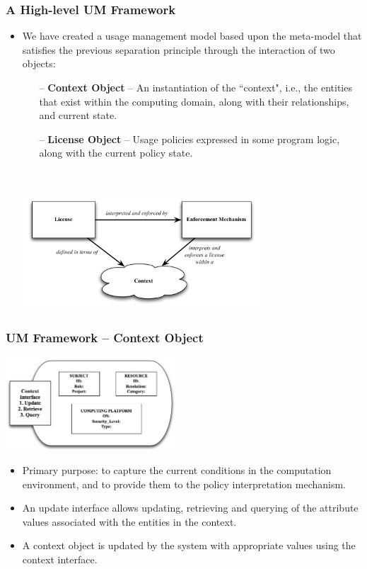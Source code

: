 \documentclass[t,handout, 10pt]{beamer}
\begin{document}
\begin{frame}\frametitle{A High-level UM Framework}
\begin{itemize}
\item We have created a usage management model based upon the meta-model that satisfies the previous separation principle through the interaction of two objects:
 \begin{itemize}
  \item[--] \textbf{Context Object} -- An instantiation of the ``context", i.e., the entities that exist within the computing domain, along with their relationships, and current state. 
  \pause
  \item[--] \textbf{License Object} -- Usage policies expressed in some program logic, along with the current policy state.
 \end{itemize}~\\
 \centerline{\includegraphics[width=3.5in]{model_overview.pdf}} 
 \end{itemize}
\end{frame}

\begin{frame}\frametitle{UM Framework -- Context Object}
  \centerline{\includegraphics[width=2.5in]{context-obj.png}}
  \begin{itemize}
   \item Primary purpose: to capture the current conditions in the computation environment, and to provide them to the policy interpretation mechanism.
   \pause
   \item An update interface allows updating, retrieving and querying of the attribute values associated with the entities in the context.
   \pause
   \item A context object is updated by the system with appropriate values using the context interface.
  \end{itemize}
\end{frame}
\end{document}
